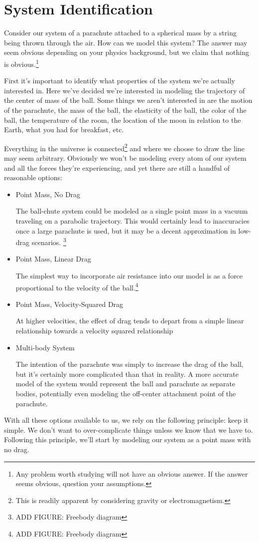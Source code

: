 \section{System Identification}

Consider our system of a parachute attached to a spherical mass by a string being thrown through the air. How can we model this system? The answer may seem obvious depending on your physics background, but we claim that nothing is obvious.\footnote{Any problem worth studying will not have an obvious answer. If the answer seems obvious, question your assumptions.}

First it's important to identify what properties of the system we're actually interested in. Here we've decided we're interested in modeling the trajectory of the center of mass of the ball. Some things we aren't interested in are the motion of the parachute, the mass of the ball, the elasticity of the ball, the color of the ball, the temperature of the room, the location of the moon in relation to the Earth, what you had for breakfast, etc. 

Everything in the universe is connected\footnote{This is readily apparent by considering gravity or electromagnetism.} and where we choose to draw the line may seem arbitrary. Obviously we won't be modeling every atom of our system and all the forces they're experiencing, and yet there are still a handful of reasonable options:

\begin{itemize}
\item Point Mass, No Drag

The ball-chute system could be modeled as a single point mass in a vacuum traveling on a parabolic trajectory. This would certainly lead to inaccuracies once a large parachute is used, but it may be a decent approximation in low-drag scenarios. \footnote{ADD FIGURE: Freebody diagram}

\item Point Mass, Linear Drag 

The simplest way to incorporate air resistance into our model is as a force proportional to the velocity of the ball.\footnote{ADD FIGURE: Freebody diagram}

\item Point Mass, Velocity-Squared Drag

At higher velocities, the effect of drag tends to depart from a simple linear relationship towards a velocity squared relationship

\item Multi-body System

The intention of the parachute was simply to increase the drag of the ball, but it's certainly more complicated than that in reality. A more accurate model of the system would represent the ball and parachute as separate bodies, potentially even modeling the off-center attachment point of the parachute. 

\end{itemize}

With all these options available to us, we rely on the following principle: keep it simple. We don't want to over-complicate things unless we know that we have to. Following this principle, we'll start by modeling our system as a point mass with no drag. 
